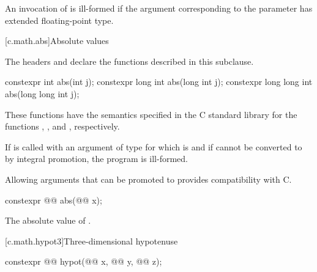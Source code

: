 \pnum
An invocation of  is ill-formed if
the argument corresponding to the  parameter
has extended floating-point type.


[c.math.abs]{Absolute values}

\pnum
\begin{note}
The headers  and
declare the functions described in this subclause.
\end{note}

%
\begin{itemdecl}
constexpr int abs(int j);
constexpr long int abs(long int j);
constexpr long long int abs(long long int j);
\end{itemdecl}

\begin{itemdescr}
\pnum
\effects
These
functions have the semantics specified in the C standard library
for the functions , , and , respectively.

\pnum
\remarks
If  is called with an argument of type 
for which  is  and
if  cannot be converted to 
by integral promotion, the program is ill-formed.
\begin{note}
Allowing arguments that can be promoted to 
provides compatibility with C.
\end{note}
\end{itemdescr}

\begin{itemdecl}
constexpr @@ abs(@@ x);
\end{itemdecl}

\begin{itemdescr}
\pnum
\returns
The absolute value of .
\end{itemdescr}


[c.math.hypot3]{Three-dimensional hypotenuse}

%
\begin{itemdecl}
constexpr @@ hypot(@@ x, @@ y,
                                    @@ z);
\end{itemdecl}

